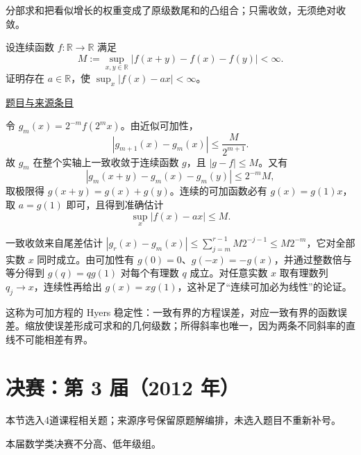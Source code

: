 \documentclass[UTF8,12pt,a4paper,fontset=fandol]{ctexart}
\begin{document}
\begin{remark}[方法与条件]分部求和把看似增长的权重变成了原级数尾和的凸组合；只需收敛，无须绝对收敛。\end{remark}

\begin{example}[来源序号5]\label{ex:fin02-all:5}\label{pr:fin02-all:5}

设连续函数 $f:\mathbb R\to\mathbb R$ 满足
\[
M:=\sup_{x,y\in\mathbb R}|f(x+y)-f(x)-f(y)|<\infty.
\]
证明存在 $a\in\mathbb R$，使 $\sup_x|f(x)-ax|<\infty$。

\par\href{https://github.com/lzxcr/cmc-mathematics/blob/64916fa1fdbc3e444a652eca204d5669058ee321/src/problems/finals/02/05.md}{题目与来源条目}

\end{example}

\begin{solve}\label{ans:fin02-all:5}

令 $g_m(x)=2^{-m}f(2^mx)$。由近似可加性，
\[
|g_{m+1}(x)-g_m(x)|\le\frac{M}{2^{m+1}}.
\]
故 $g_m$ 在整个实轴上一致收敛于连续函数 $g$，且 $|g-f|\le M$。又有
\[
|g_m(x+y)-g_m(x)-g_m(y)|\le2^{-m}M,
\]
取极限得 $g(x+y)=g(x)+g(y)$。连续的可加函数必有 $g(x)=g(1)x$，取 $a=g(1)$ 即可，且得到准确估计
\[
\sup_x|f(x)-ax|\le M.
\]

一致收敛来自尾差估计 $|g_r(x)-g_m(x)|\le\sum_{j=m}^{r-1}M2^{-j-1}\le M2^{-m}$，它对全部实数 $x$ 同时成立。由可加性有 $g(0)=0$、$g(-x)=-g(x)$，并通过整数倍与等分得到 $g(q)=qg(1)$ 对每个有理数 $q$ 成立。对任意实数 $x$ 取有理数列 $q_j\to x$，连续性再给出 $g(x)=xg(1)$，这补足了“连续可加必为线性”的论证。

\end{solve}

\begin{remark}[方法与条件]这称为可加方程的 Hyers 稳定性：一致有界的方程误差，对应一致有界的函数误差。缩放使误差形成可求和的几何级数；所得斜率也唯一，因为两条不同斜率的直线不可能相差有界。\end{remark}

\section{决赛：第 3 届（2012 年）}

本节选入4道课程相关题；来源序号保留原题解编排，未选入题目不重新补号。

\begin{remark}[来源说明]本届数学类决赛不分高、低年级组。\end{remark}
\end{document}
